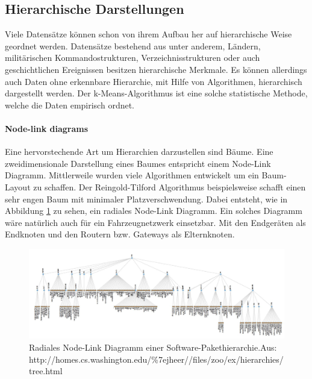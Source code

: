 \documentclass[draft=false
              ,paper=a4
              ,twoside=false
              ,fontsize=11pt
              ,headsepline
              ,BCOR10mm
              ,DIV11
              ]{scrbook}
\begin{document}
\subsection{Hierarchische Darstellungen} %
\label{ssub:hierachische_darstellungen}
Viele Datensätze können schon von ihrem Aufbau her auf hierarchische Weise geordnet werden. Datensätze bestehend aus unter anderem, Ländern, militärischen Kommandostrukturen, Verzeichnisstrukturen oder auch geschichtlichen Ereignissen besitzen hierarchische Merkmale. Es können allerdings auch Daten ohne erkennbare Hierarchie, mit Hilfe von Algorithmen, hierarchisch dargestellt werden. Der k-Means-Algorithmus ist eine solche statistische Methode, welche die Daten empirisch ordnet. 

\paragraph{Node-link diagrams} %
\label{par:node_link_diagrams}
Eine hervorstechende Art um Hierarchien darzustellen sind Bäume. Eine zweidimensionale Darstellung eines Baumes entspricht einem Node-Link Diagramm. Mittlerweile wurden viele Algorithmen entwickelt um ein Baum-Layout zu schaffen. Der Reingold-Tilford Algorithmus \cite{reingold_tidier_1981} beispielsweise schafft einen sehr engen Baum mit minimaler Platzverschwendung. Dabei entsteht, wie in Abbildung \ref{fig:nodelink} zu sehen, ein radiales Node-Link Diagramm. Ein solches Diagramm wäre natürlich auch für ein Fahrzeugnetzwerk einsetzbar. Mit den Endgeräten als Endknoten und den Routern bzw. Gateways als Elternknoten.
\begin{figure}[htbp]
  \centering
  \includegraphics[width=\textwidth]{img/nodelink}
  \caption{Radiales Node-Link Diagramm einer Software-Pakethierarchie.\newline Aus: http://homes.cs.washington.edu/\%7ejheer//files/zoo/ex/hierarchies/tree.html}
  \label{fig:nodelink}
\end{figure}
\end{document}
